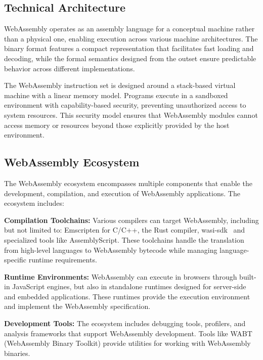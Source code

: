 \subsection{Technical Architecture}
\label{subsec:wasm-architecture}

WebAssembly operates as an assembly language for a conceptual machine rather than a physical one, enabling execution across various machine architectures. The binary format features a compact representation that facilitates fast loading and decoding, while the formal semantics designed from the outset ensure predictable behavior across different implementations\cite{rossberg2018webassembly}.

The WebAssembly instruction set is designed around a stack-based virtual machine with a linear memory model. Programs execute in a sandboxed environment with capability-based security, preventing unauthorized access to system resources. This security model ensures that WebAssembly modules cannot access memory or resources beyond those explicitly provided by the host environment.

\subsection{WebAssembly Ecosystem}
\label{subsec:wasm-ecosystem}

The WebAssembly ecosystem encompasses multiple components that enable the development, compilation, and execution of WebAssembly applications. The ecosystem includes:

\textbf{Compilation Toolchains:} Various compilers can target WebAssembly, including but not limited to: Emscripten for C/C++, the Rust compiler, wasi-sdk~\cite{wasisdk} and specialized tools like AssemblyScript. These toolchains handle the translation from high-level languages to WebAssembly bytecode while managing language-specific runtime requirements.

\textbf{Runtime Environments:} WebAssembly can execute in browsers through built-in JavaScript engines, but also in standalone runtimes designed for server-side and embedded applications. These runtimes provide the execution environment and implement the WebAssembly specification.

\textbf{Development Tools:} The ecosystem includes debugging tools, profilers, and analysis frameworks that support WebAssembly development. Tools like WABT (WebAssembly Binary Toolkit) provide utilities for working with WebAssembly binaries.

